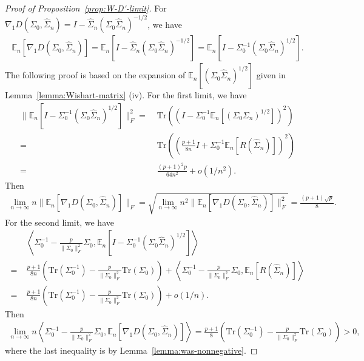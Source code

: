 \documentclass[11pt]{article}
\def\la{\langle}
\def\ra{\rangle}
\def\E {\mathbb{E}}
\def\tr{\mathrm{Tr}}
\def\la{\langle}
\def\ra{\rangle}
\newcommand{\wh}{\widehat}
\begin{document}
\begin{proof}[Proof of Proposition~\ref{prop:W-D'-limit}]
    For ${\nabla_1 D }(\Sigma_0, \wh\Sigma_n) = I - \wh\Sigma_n(\Sigma_0\wh\Sigma_n)^{-1/2}$, we have 
    \begin{align*}
        \E_n[{\nabla_1 D }(\Sigma_0, \wh\Sigma_n)] = \E_n[I - \wh\Sigma_n(\Sigma_0\wh\Sigma_n)^{-1/2}] = \E_n[I-\Sigma_0^{-1}(\Sigma_0\wh\Sigma_n)^{1/2}].
    \end{align*}
    The following proof is based on the expansion of $\E_n [(\Sigma_0\wh\Sigma_n)^{1/2}]$ given in Lemma~\ref{lemma:Wishart-matrix} (iv). For the first limit, we have
    \begin{align}
    \|\E_n [I - \Sigma_0^{-1}(\Sigma_0\wh\Sigma_n)^{1/2}]\|_F^2 = \;&\tr\left((I-\Sigma_0^{-1}\E_n [(\Sigma_0\Sigma_n)^{1/2}])^2\right)\nonumber\\
    =\;&\tr\left(\left(\frac{p+1}{8n}I+\Sigma_0^{-1}\E_n [R(\wh \Sigma_n)]\right)^2\right)\nonumber\\
    =\;&\frac{(p+1)^2p}{64n^2}+o(1/n^2).
    \end{align}
    Then 
    \begin{align*}
        \lim_{n\to\infty} n\|\E_n[{\nabla_1 D }(\Sigma_0, \wh\Sigma_n)]\|_F = \sqrt{\lim_{n\to\infty} n^2\|\E_n[{\nabla_1 D }(\Sigma_0, \wh\Sigma_n)]\|_F^2} = \frac{(p+1)\sqrt{p}}{8}.
    \end{align*}
    For the second limit, we have 
    \begin{align}
        &\left\la \Sigma_0^{-1}-\frac{p}{\|\Sigma_0\|_F^2}\Sigma_0, \E_n [I - \Sigma_0^{-1}(\Sigma_0\wh\Sigma_n)^{1/2}]\right\ra \nonumber\\=\;& \frac{p+1}{8n}\left(\tr(\Sigma_0^{-1}) - \frac{p}{\|\Sigma_0\|_F^2}\tr(\Sigma_0)\right) + \left\la\Sigma_0^{-1}-\frac{p}{\|\Sigma_0\|_F^2}\Sigma_0, \E_n [R(\wh\Sigma_n)]\right\ra\nonumber\\
        =\;& \frac{p+1}{8n}\left(\tr(\Sigma_0^{-1}) - \frac{p}{\|\Sigma_0\|_F^2}\tr(\Sigma_0)\right) + o (1/n).\
    \end{align}
    Then 
    \begin{align*}
        \lim_{n\to\infty} n\left\la \Sigma_0^{-1}-\frac{p}{\|\Sigma_0\|_F^2}\Sigma_0, \E_n [{\nabla_1 D }(\Sigma_0, \wh\Sigma_n)]\right\ra= \frac{p+1}{8}\left(\tr(\Sigma_0^{-1}) - \frac{p}{\|\Sigma_0\|_F^2}\tr(\Sigma_0)\right)> 0,
    \end{align*}
    where the last inequality is by Lemma~\ref{lemma:was-nonnegative}.
\end{proof}
\end{document}
